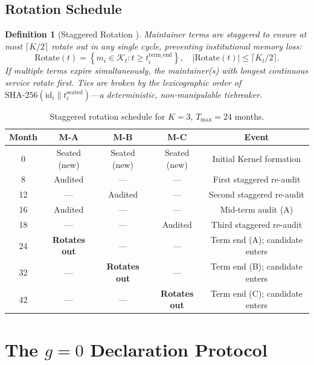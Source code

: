 \documentclass[12pt,a4paper]{article}
\newtheorem{definition}[theorem]{Definition}
\theoremstyle{definition}
\newcommand{\Kernel}{\mathcal{K}}
\begin{document}
\subsection{Rotation Schedule}
\begin{definition}[Staggered Rotation ]
\label{def:staggered}
Maintainer terms are staggered to ensure at most $\lceil K/2 \rceil$ rotate out in any single cycle, preventing institutional memory loss:
\begin{equation}
    \text{Rotate}(t) = \left\{m_i \in \Kernel_t : t \geq t_i^{\text{term\_end}}\right\}, \quad |\text{Rotate}(t)| \leq \lceil K_t / 2 \rceil.
    \label{eq:staggered}
\end{equation}
If multiple terms expire simultaneously, the maintainer(s) with longest continuous service rotate first. Ties are broken by the lexicographic order of $\text{SHA-256}(\text{id}_i \| t_i^{\text{seated}})$---a deterministic, non-manipulable tiebreaker.
\end{definition}
\begin{table}[htbp]
\centering
\caption{Staggered rotation schedule for $K=3$, $T_{\max}=24$ months.}
\label{tab:rotation}
\begin{tabular}{c c c c c}
\toprule
\textbf{Month} & \textbf{M-A} & \textbf{M-B} & \textbf{M-C} & \textbf{Event} \\
\midrule
0  & Seated (new) & Seated (new) & Seated (new) & Initial Kernel formation \\
8  & Audited      & ---          & ---          & First staggered re-audit \\
12 & ---          & Audited      & ---          & Second staggered re-audit \\
16 & Audited      & ---          & ---          & Mid-term audit (A) \\
18 & ---          & ---          & Audited      & Third staggered re-audit \\
24 & \textbf{Rotates out} & ---   & ---          & Term end (A); candidate enters \\
32 & ---          & \textbf{Rotates out} & ---   & Term end (B); candidate enters \\
42 & ---          & ---          & \textbf{Rotates out} & Term end (C); candidate enters \\
\bottomrule
\end{tabular}
\end{table}
\section{The \texorpdfstring{$g=0$}{g=0} Declaration Protocol }
\label{sec:gzero}
\end{document}
